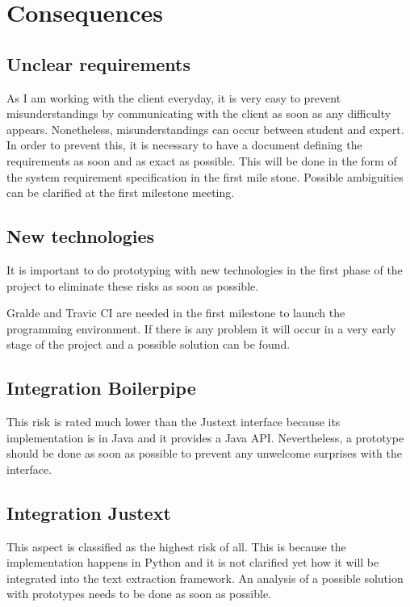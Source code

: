 \section{Consequences}



\subsection{Unclear requirements}

As I am working with the client everyday, it is very easy to prevent misunderstandings by communicating with the client as soon as any difficulty appears. Nonetheless, misunderstandings can occur between student and expert. In order to prevent this, it is necessary to have a document defining the requirements as soon and as exact as possible. This will be done in the form of the system requirement specification in the first mile stone. Possible ambiguities can be clarified at the first milestone meeting.

\subsection{New technologies}

It is important to do prototyping with new technologies in the first phase of the project to eliminate these risks as soon as possible.

Gralde and Travic CI are needed in the first milestone to launch the programming environment. If there is any problem it will occur in a very early stage of the project and a possible solution can be found.

\subsection{Integration Boilerpipe}

This risk is rated much lower than the Justext interface because its implementation is in Java and it provides a Java API. Nevertheless, a prototype should be done as soon as possible to prevent any unwelcome surprises with the interface.

\subsection{Integration Justext}
\label{subsec:Integration Justext}

This aspect is classified as the highest risk of all. This is because the implementation happens in Python and it is not clarified yet how it will be integrated into the text extraction framework. An analysis of a possible solution with prototypes needs to be done as soon as possible.

